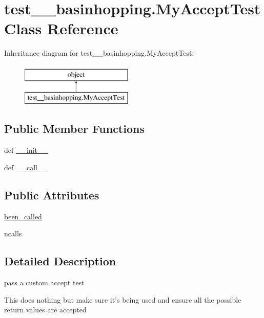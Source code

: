 \hypertarget{classtest____basinhopping_1_1MyAcceptTest}{}\section{test\+\_\+\+\_\+basinhopping.\+My\+Accept\+Test Class Reference}
\label{classtest____basinhopping_1_1MyAcceptTest}
Inheritance diagram for test\+\_\+\+\_\+basinhopping.\+My\+Accept\+Test\+:\begin{figure}[H]
\begin{center}
\leavevmode
\includegraphics[height=2.000000cm]{classtest____basinhopping_1_1MyAcceptTest}
\end{center}
\end{figure}
\subsection*{Public Member Functions}
\begin{DoxyCompactItemize}
\item 
def \hyperlink{classtest____basinhopping_1_1MyAcceptTest_afeec76a6289853924d4fdd8b8caa9124}{\+\_\+\+\_\+init\+\_\+\+\_\+}
\item 
def \hyperlink{classtest____basinhopping_1_1MyAcceptTest_a16f2ff46a7ba8c965d632512fb05e1d1}{\+\_\+\+\_\+call\+\_\+\+\_\+}
\end{DoxyCompactItemize}
\subsection*{Public Attributes}
\begin{DoxyCompactItemize}
\item 
\hyperlink{classtest____basinhopping_1_1MyAcceptTest_a7fb60cfd3c07da67f1236fb54cac03f7}{been\+\_\+called}
\item 
\hyperlink{classtest____basinhopping_1_1MyAcceptTest_ad2bc6f1ec8638071f9aa18cf3d3d7811}{ncalls}
\end{DoxyCompactItemize}


\subsection{Detailed Description}
\begin{DoxyVerb}pass a custom accept test

This does nothing but make sure it's being used and ensure all the
possible return values are accepted
\end{DoxyVerb}
 

